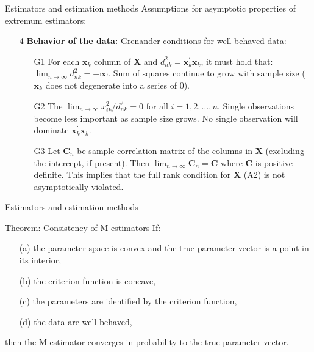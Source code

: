 \documentclass{beamer}
\begin{document}
\begin{frame}{Estimators and estimation methods}
Assumptions for asymptotic properties of extremum estimators:
\medskip
\begin{itemize}
    \item[4] \textbf{Behavior of the data:} Grenander conditions for well-behaved data:
    \medskip
    \begin{itemize}
        \item[G1] For each $\bm{x}_k$ column of $\bm{X}$ and $d_{nk}^2 = \bm{x}_k^{\prime}\bm{x}_k$, it must hold that: $\lim_{n \rightarrow \infty} d_{nk}^2 = + \infty$. Sum of squares continue to grow with sample size ($\bm{x}_k$ does not degenerate into a series of 0).
        \smallskip
        \item[G2] The $\lim_{n \rightarrow \infty} x_{ik}^2 / d_{nk}^2 = 0$ for all $i=1,2,\dots,n$. Single observations become less important as sample size grows. No single observation will dominate $\bm{x}_k^{\prime}\bm{x}_k$.
        \smallskip
        \item[G3] Let $\bm{C}_n$ be sample correlation matrix of the columns in $\bm{X}$ (excluding the intercept, if present). Then $\lim_{n \rightarrow \infty} \bm{C}_n = \bm{C}$ where $\bm{C}$ is positive definite. This implies that the full rank condition for $\bm{X}$ (A2) is not asymptotically violated.
    \end{itemize}
\end{itemize}
\end{frame}
\begin{frame}{Estimators and estimation methods}
\begin{block}{Theorem: Consistency of M estimators}
If: \\ \smallskip 
\begin{itemize}
    \item[(a)] the parameter space is convex and the true parameter vector is a point in its interior,
    \smallskip
    \item[(b)] the criterion function is concave,
    \smallskip
    \item[(c)] the parameters are identified by the criterion function,
    \smallskip
    \item[(d)] the data are well behaved,\\ \smallskip
\end{itemize}
then the M estimator converges in probability to the true parameter vector. 
\end{block}
\end{frame}
\end{document}
